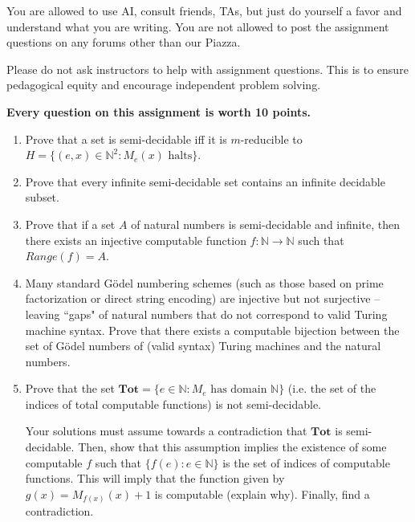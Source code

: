 \documentclass[11pt]{article}
\begin{document}
You are allowed to use AI, consult friends, TAs, but just do yourself a favor and understand what you are writing.  You are not allowed to post the assignment questions on any forums other than our Piazza.  

\vspace{0.2cm}

Please do not ask instructors to help with assignment questions. This is to ensure pedagogical equity and encourage independent problem solving.




\vspace{0.2cm}

\textbf{Every question on this assignment is worth 10 points.}


	\begin{enumerate}[{\bf Q1.}]



\item  Prove that a set is semi-decidable iff it is $m$-reducible to $H=\{\left( e,x \right)\in\mathbb{N}^2 \colon M_e(x) \text{ halts}\}$. 

\item Prove that every infinite semi-decidable set contains an infinite decidable subset.

\item  Prove that if a set $A$ of natural numbers is semi-decidable and infinite, then there exists an injective computable function $f\colon\mathbb{N}\to\mathbb{N}$ such that $Range(f)=A$.

\item Many standard G\"odel numbering schemes (such as those based on prime factorization or direct string encoding) are injective but not surjective -- leaving ``gaps" of natural numbers that do not correspond to valid Turing machine syntax. Prove that there exists a computable bijection between the set of G\"odel numbers of (valid syntax) Turing machines and the natural numbers.



\item  Prove that the set $\mathbf{Tot} = \{e\in\mathbb{N} \colon M_e \text{ has domain }\mathbb{N}\}$ (i.e. the set of the indices of total computable functions) is not semi-decidable.

Your solutions must assume towards a contradiction that $\mathbf{Tot}$ is semi-decidable. Then, show that this assumption implies the existence of some computable $f$ such that $\{ {f(e)} \colon e \in\mathbb{N}\}$ is the set of indices of computable functions. This will imply that the function given by $g(x)=M_{f(x)}(x)+1$ is computable (explain why). Finally, find a contradiction.


\end{enumerate}
\end{document}
